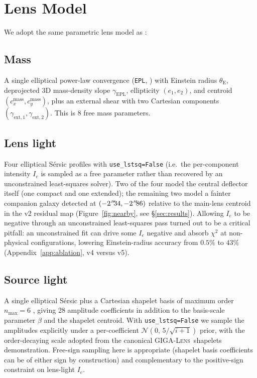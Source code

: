 \documentclass[11pt,letterpaper]{article}
\newcommand{\thetaE}{\ensuremath{\theta_{\mathrm{E}}}}
\newcommand{\gammaEPL}{\ensuremath{\gamma_{\mathrm{EPL}}}}
\newcommand{\gextone}{\ensuremath{\gamma_{\mathrm{ext},1}}}
\newcommand{\gexttwo}{\ensuremath{\gamma_{\mathrm{ext},2}}}
\newcommand{\eone}{\ensuremath{e_{1}}}
\newcommand{\etwo}{\ensuremath{e_{2}}}
\newcommand{\gigalens}{\textsc{GIGA-Lens}}
\begin{document}
\section{Lens Model}
\label{sec:model}

We adopt the same parametric lens model as \citet{huang2025foundry1}:

\subsection{Mass}
A single elliptical power-law convergence
(\texttt{EPL}, \citealt{gu2022gigalens,birrer2018lenstronomy}) with
Einstein radius \thetaE, deprojected 3D mass-density slope \gammaEPL,
ellipticity $(\eone,\etwo)$, and centroid
$(c_{x}^{\mathrm{mass}},c_{y}^{\mathrm{mass}})$,
plus an external shear with two Cartesian components
$(\gextone,\gexttwo)$. This is 8 free mass parameters.

\subsection{Lens light}
Four elliptical S\'{e}rsic profiles with
\texttt{use\_lstsq=False} (i.e.\ the per-component intensity
$I_{e}$ is sampled as a free parameter rather than recovered by an
unconstrained least-squares solver). Two of the four model the central
deflector itself (one compact and one extended); the remaining two
model a fainter companion galaxy detected at $(-2\farcs34,-2\farcs86)$
relative to the main-lens centroid in the v2 residual map
(Figure~\ref{fig:nearby}, see \S\ref{sec:results}). Allowing
$I_{e}$ to be negative through an unconstrained least-squares pass
turned out to be a critical pitfall: an unconstrained fit can drive
some $I_{e}$ negative and absorb $\chi^{2}$ at non-physical
configurations, lowering Einstein-radius accuracy from $0.5\%$ to
$43\%$ (Appendix~\ref{app:ablation}, v4 versus v5).

\subsection{Source light}
A single elliptical S\'{e}rsic plus a Cartesian shapelet basis of
maximum order $n_{\max}=6$ \citep{gu2022gigalens}, giving 28 amplitude
coefficients in addition to the basis-scale parameter $\beta$ and the
shapelet centroid. With \texttt{use\_lstsq=False} we sample the
amplitudes explicitly under a per-coefficient
$\mathcal{N}(0,\,5/\sqrt{i+1})$ prior, with the order-decaying scale
adopted from the canonical \gigalens\ shapelets demonstration. Free-sign
sampling here is appropriate (shapelet basis coefficients can be of
either sign by construction) and complementary to the positive-sign
constraint on lens-light $I_{e}$.
\end{document}
